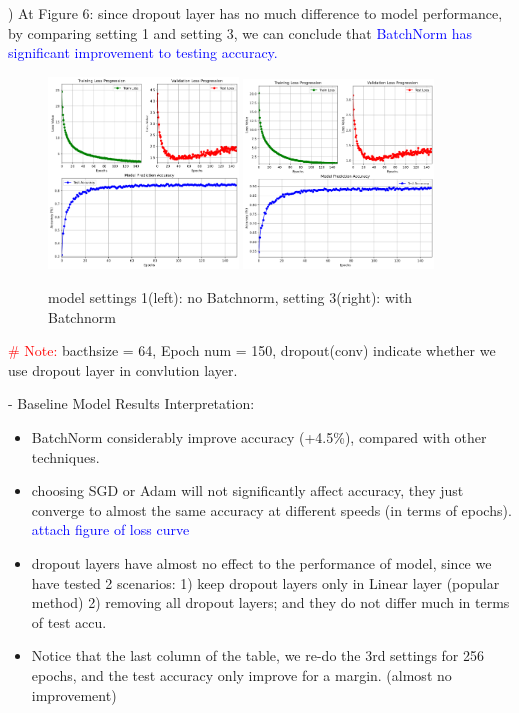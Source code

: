\documentclass{article}
\begin{document}
) At Figure 6: since dropout layer has no much difference to model performance, by comparing setting 1 and setting 3, we can conclude that \textcolor{blue}{BatchNorm has significant improvement to testing accuracy.} \\

\begin{figure}[hbtp]
  \centering
  \includegraphics[width=0.45\textwidth]{fig/train_result_1.png} %
  \includegraphics[width=0.45\textwidth]{fig/train_result_3.png} %
  \caption{model settings 1(left): no Batchnorm, setting 3(right): with Batchnorm} %
  \label{fig:curve} %
\end{figure}




\textcolor{red}{\# Note:} bacthsize = 64, Epoch num = 150, dropout(conv) indicate whether we use dropout layer in convlution layer.

\noindent - Baseline Model Results Interpretation: 
\begin{itemize}
  \item BatchNorm considerably improve accuracy (+4.5\%), compared with other techniques.
  \item choosing SGD or Adam will not significantly affect accuracy, they just converge to almost the same accuracy at different speeds (in terms of epochs). \textcolor{blue}{attach figure of loss curve}
  \item dropout layers have almost no effect to the performance of model, since we have tested 2 scenarios: 1) keep dropout layers only in Linear layer (popular method) 2) removing all dropout layers; and they do not differ much in terms of test accu.
  \item Notice that the last column of the table, we re-do the 3rd settings for 256 epochs, and the test accuracy only improve for a margin. (almost no improvement)
\end{itemize}
\end{document}

